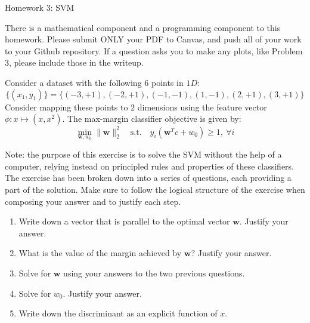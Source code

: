 \documentclass[submit]{harvardml}
\begin{document}
\begin{center}
{\Large Homework 3: SVM}\\
\end{center}

There is a mathematical component and a programming component to this homework.
Please submit ONLY your PDF to Canvas, and push all of your work to your Github
repository. If a question asks you to make any plots, like Problem 3, please
include those in the writeup.

\begin{problem}
Consider a dataset with the following 6 points in $1D$: \[\{(x_1, y_1)\} =\{(-3
, +1 ), (-2 , +1 ) , (-1,  -1 ), ( 1 , -1 ), ( 2 , +1 ), ( 3 , +1 )\}\] Consider
mapping these points to $2$ dimensions using the feature vector $\phi : x
\mapsto (x, x^2)$. The max-margin classifier objective is given by:
\begin{equation}
  \min_{\mathbf{w}, w_0} \|\mathbf{w}\|_2^2 \quad \text{s.t.} \quad y_i(\mathbf{w}^T c +
  w_0) \geq 1,~\forall i
\end{equation}

Note: the purpose of this exercise is to solve the SVM without the help of a
computer, relying instead on principled rules and properties of these
classifiers. The exercise has been broken down into a series of questions, each
providing a part of the solution. Make sure to follow the logical structure of
the exercise when composing your answer and to justify each step.

\begin{enumerate}
  \item Write down a vector that is parallel to the optimal vector $\mathbf{w}$. Justify
    your answer.
  \item What is the value of the margin achieved by $\mathbf{w}$? Justify your
    answer.
  \item Solve for $\mathbf{w}$ using your answers to the two previous questions.
  \item Solve for $w_0$. Justify your answer.
  \item Write down the discriminant as an explicit function of $x$.
\end{enumerate}

\end{problem}
\end{document}
